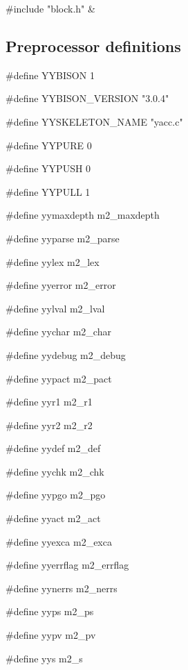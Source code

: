 \medskip
\begin{cxreftabi}
{\stt \#include "block.h"} &\\
\end{cxreftabi}


\subsection*{Preprocessor definitions}

{\stt \#define YYBISON 1}

\medskip
{\stt \#define YYBISON\_VERSION "3.0.4"}

\medskip
{\stt \#define YYSKELETON\_NAME "yacc.c"}

\medskip
{\stt \#define YYPURE 0}

\medskip
{\stt \#define YYPUSH 0}

\medskip
{\stt \#define YYPULL 1}

\medskip
{\stt \#define yymaxdepth m2\_maxdepth}

\medskip
{\stt \#define yyparse m2\_parse}

\medskip
{\stt \#define yylex m2\_lex}

\medskip
{\stt \#define yyerror m2\_error}

\medskip
{\stt \#define yylval m2\_lval}

\medskip
{\stt \#define yychar m2\_char}

\medskip
{\stt \#define yydebug m2\_debug}

\medskip
{\stt \#define yypact m2\_pact}

\medskip
{\stt \#define yyr1 m2\_r1}

\medskip
{\stt \#define yyr2 m2\_r2}

\medskip
{\stt \#define yydef m2\_def}

\medskip
{\stt \#define yychk m2\_chk}

\medskip
{\stt \#define yypgo m2\_pgo}

\medskip
{\stt \#define yyact m2\_act}

\medskip
{\stt \#define yyexca m2\_exca}

\medskip
{\stt \#define yyerrflag m2\_errflag}

\medskip
{\stt \#define yynerrs m2\_nerrs}

\medskip
{\stt \#define yyps m2\_ps}

\medskip
{\stt \#define yypv m2\_pv}

\medskip
{\stt \#define yys m2\_s}

